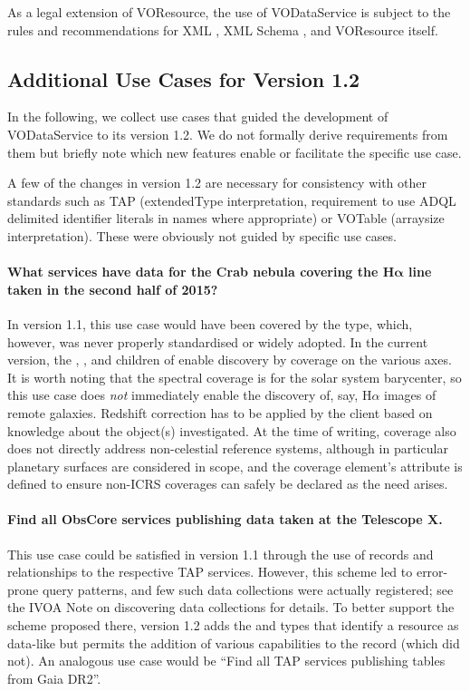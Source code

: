 \documentclass[11pt,a4paper]{ivoa}
\begin{document}
As a legal extension of VOResource, the use
of VODataService is subject to the rules and recommendations for XML
\citep{std:XML}, XML Schema \citep{std:XSD},
and VOResource itself.  

\subsection{Additional Use Cases for Version 1.2}

In the following, we collect use cases that guided the development of
VODataService to its version 1.2.  We do not formally derive
requirements from them but briefly note which new features enable or
facilitate the specific use case.

A few of the changes in version 1.2 are necessary for consistency with other standards
such as TAP (extendedType interpretation, requirement to use ADQL
delimited identifier literals in names where appropriate) or VOTable
(arraysize interpretation).  These were obviously not guided by specific
use cases.


\paragraph{What services have data for the Crab nebula covering the
H$\boldsymbol\alpha$ 
line taken in the second half of 2015?}  In version 1.1, this use case
would have been covered by the  type,
which, however, was never properly standardised or widely adopted.  In the current
version, the , , and 
children of  enable discovery by coverage on the various
axes.  It is worth noting that the spectral coverage is for the solar
system barycenter, so this use case does \emph{not} immediately enable
the discovery of, say, H$\alpha$ images of remote galaxies.  Redshift
correction has to be applied by the client based on knowledge about the
object(s) investigated.  At the time of writing, coverage also does not
directly address non-celestial reference systems, although in particular
planetary surfaces are considered in scope, and the coverage element's
 attribute is defined to ensure non-ICRS coverages can
safely be declared as the need arises.

\paragraph{Find all ObsCore services publishing data taken at the
Telescope X.} This use case could be satisfied in version 1.1 through
the use of  records and relationships to the
respective TAP services.  However, this scheme led to error-prone query
patterns, and few such data collections were actually registered; see
the IVOA Note on discovering data collections \citep{2019ivoa.rept.0520D} for
details.  To better support the scheme proposed there, version 1.2 adds
the  and  types 
that identify a resource as data-like but
permits the addition of various capabilities to the record (which
 did not).  An analogous use case would be
``Find all TAP services publishing tables from Gaia DR2''.
\end{document}
